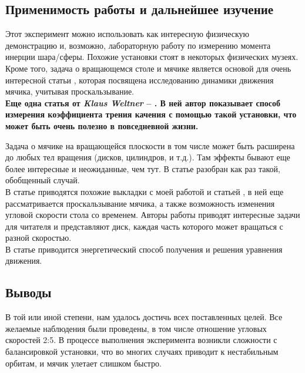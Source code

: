 \documentclass[a4paper,12pt]{article}
\begin{document}
	\subsection{Применимость работы и дальнейшее изучение}
	Этот эксперимент можно использовать как интересную физическую демонстрацию и, возможно, лабораторную работу по измерению момента инерции шара/сферы. Похожие установки стоят в некоторых физических музеях.\\
	
	Кроме того, задача о вращающемся столе и мячике является основой для очень интересной статьи \cite{dynamics}, которая посвящена исследованию динамики движения мячика, учитывая проскальзывание. \\
	
	\textbf{Еще одна статья от \emph{Klaus Weltner} -- \cite{weltner2}. В ней автор показывает способ измерения коэффициента трения качения с помощью такой установки, что может быть очень полезно в повседневной жизни.\\}
	
	Задача о мячике на вращающейся плоскости в том числе может быть расширена до любых тел вращения (дисков, цилиндров, и т.д.). Там эффекты бывают еще более интересные и неожиданные, чем тут. В статье \cite{dynamics} разобран как раз такой, обобщенный случай.\\
	
	В статье \cite{Gersten} приводятся похожие выкладки с моей работой и статьей \cite{weltner}, в ней еще рассматривается проскальзывание мячика, а также возможность изменения угловой скорости стола со временем. Авторы работы приводят интересные задачи для читателя и представляют диск, каждая часть которого может вращаться с разной скоростью.\\
	
	В статье \cite{Warren} приводится энергетический способ получения и решения уравнения движения.
	
	\subsection{Выводы}
	В той или иной степени, нам удалось достичь всех поставленных целей. Все желаемые наблюдения были проведены, в том числе отношение угловых скоростей 2:5. В процессе выполнения эксперимента возникли сложности с балансировкой установки, что во многих случаях приводит к нестабильным орбитам, и мячик улетает слишком быстро.
	
\end{document}
